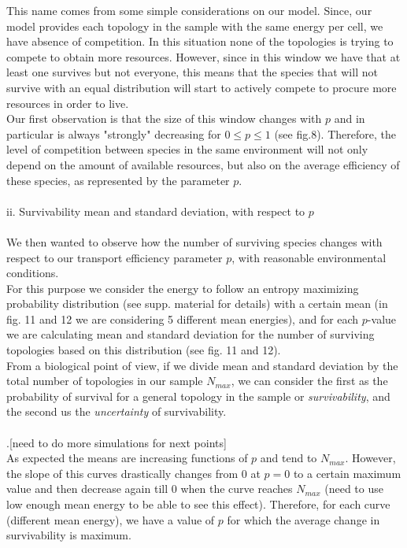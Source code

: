 \documentclass{amsart}
\theoremstyle{plain}
\numberwithin{equation}{section}
\begin{document}
This name comes from some simple considerations on our model. Since, our model provides each topology in the sample with the same energy per cell, we have absence of competition. In this situation none of the topologies is trying to compete to obtain more resources. However, since in this window we have that at least one survives but not everyone, this means that the species that will not survive with an equal distribution will start to actively compete to procure more resources in order to live.\\
Our first observation is that the size of this window changes with $p$ and in particular is always "strongly" decreasing for $0\leq p\leq1$ (see fig.8). Therefore, the level of competition between species in the same environment will not only depend on the amount of available resources, but also on the average efficiency of these species, as represented by the parameter $p$.\\
\\
ii. Survivability mean and standard deviation, with respect to $p$\\
\\
We then wanted to observe how the number of surviving species changes with respect to our transport efficiency parameter $p$, with reasonable environmental conditions.\\
 For this purpose we consider the energy to follow an entropy maximizing probability distribution (see supp. material for details) with a certain mean (in fig. 11 and 12 we are considering 5 different mean energies), and for each  $p$-value we are calculating mean and standard deviation for the number of surviving topologies based on this distribution (see fig. 11 and 12).\\From a biological point of view, if we divide mean and standard deviation by the total number of topologies in our sample $N_{max}$, we can consider the first as the probability of survival for a general topology in the sample or \textit{survivability}, and the second us the \textit{uncertainty} of survivability.\\
 \\.[need to do more simulations for next points]\\
As expected the means are increasing functions of $p$ and tend to $N_{max}$. However, the slope of this curves drastically changes from $0$ at $p=0$ to a certain maximum value and then decrease again till $0$ when the curve reaches $N_{max}$ (need to use low enough mean energy to be able to see this effect). Therefore, for each curve (different mean energy), we have a value of $p$ for which the average change in survivability is maximum.\\
\end{document}
